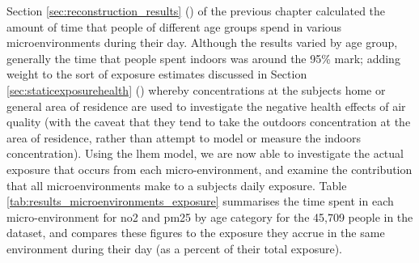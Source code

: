 Section \ref{sec:reconstruction_results} () of the previous chapter calculated the amount of time that people of different age groups spend in various microenvironments during their day. Although the results varied by age group, generally the time that people spent indoors was around the 95\% mark; adding weight to the sort of exposure estimates discussed in Section \ref{sec:staticexposurehealth} () whereby concentrations at the subjects home or general area of residence are used to investigate the negative health effects of air quality (with the caveat that they tend to take the outdoors concentration at the area of residence, rather than attempt to model or measure the indoors concentration). Using the \gls{lhem} model, we are now able to investigate the actual exposure that occurs from each micro-environment, and examine the contribution that all microenvironments make to a subjects daily exposure. Table \ref{tab:results_microenvironments_exposure} summarises the time spent in each micro-environment for \gls{no2} and \gls{pm25} by age category for the 45,709 people in the dataset, and compares these figures to the exposure they accrue in the same environment during their day (as a percent of their total exposure).


